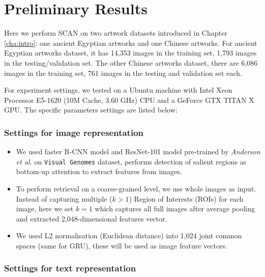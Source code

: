 
\section{Preliminary Results}
Here we perform SCAN on two artwork datasets introduced in Chapter \ref{cha:intro}: one ancient Egyptian artworks and one Chinese artworks. For ancient Egyptian artworks dataset, it has 14,353 images in the training set, 1,793 images in the testing/validation set. The other Chinese artworks dataset, there are 6,086 images in the training set, 761 images in the testing and validation set each.

For experiment settings, we tested on a Ubuntu machine with Intel Xeon Processor E5-1620 (10M Cache, 3.60 GHz) CPU and a GeForce GTX TITAN X GPU. The specific parameters settings are listed below:

\subsubsection{Settings for image representation}

\begin{itemize}
    \item We used faster R-CNN model and ResNet-101 model pre-trained by \textit{Anderson et al.} on \verb|Visual Genomes| dataset, performs detection of salient regions as bottom-up attention to extract features from images. 
    \item To perform retrieval on a coarse-grained level, we use whole images as input. Instead of capturing multiple ($k>1$) Region of Interests (ROIs) for each image, here we set $k=1$ which captures all full images after average pooling and extracted 2,048-dimensional features vector.
    \item We used L2 normalisation (Euclidean distance) into 1,024 joint common spaces (same for GRU), these will be used as image feature vectors.
\end{itemize}

\subsubsection{Settings for text representation}

